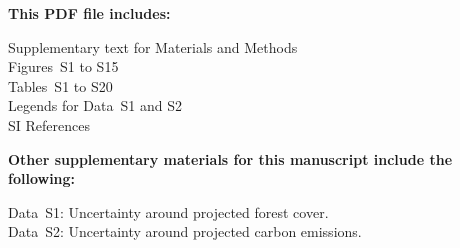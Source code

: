 \vspace{1cm}

\textbf{This PDF file includes:}

Supplementary text for Materials and Methods\\
Figures~S1 to S15\\
Tables~S1 to S20\\
Legends for Data~S1 and S2\\
SI References

\vspace{0.5cm}

\textbf{Other supplementary materials for this manuscript include the following:}

Data~S1: Uncertainty around projected forest cover.\\
Data~S2: Uncertainty around projected carbon emissions.

\newpage